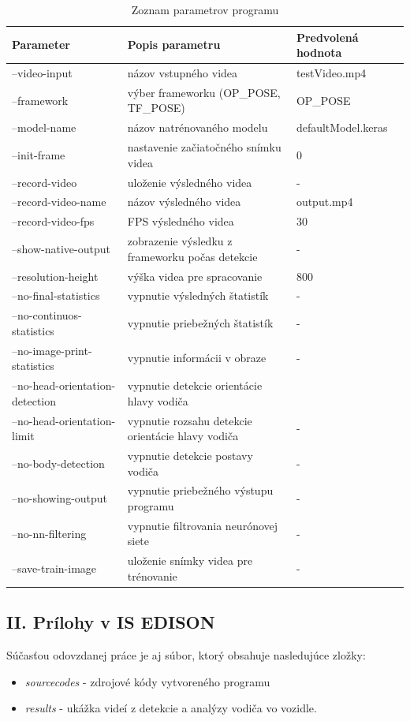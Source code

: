 \documentclass[slovak,master,dept460,male,cpp,cpdeclaration]{diploma}
\begin{document}
\begin{table}[H]
\centering
\begin{tabular}{|l|p{65mm}|p{32mm}|}
\hline
\textbf{Parameter}        & \textbf{Popis parametru}   & \textbf{Predvolená hodnota} \\ \hline
--video-input      &  názov vstupného videa   & testVideo.mp4       \\ \hline
--framework      & výber frameworku (OP\_POSE, TF\_POSE)     & OP\_POSE   \\ \hline
--model-name      & názov natrénovaného modelu     & defaultModel.keras  \\ \hline
--init-frame      & nastavenie začiatočného snímku videa    & 0  \\ \hline
--record-video    & uloženie výsledného videa    & -  \\ \hline
--record-video-name    & názov výsledného videa  & output.mp4  \\ \hline
--record-video-fps    & FPS výsledného videa    & 30  \\ \hline
--show-native-output    & zobrazenie  výsledku z frameworku počas detekcie    & -  \\ \hline
--resolution-height    & výška videa pre spracovanie    & 800  \\ \hline 
--no-final-statistics    & vypnutie výsledných štatistík    & -  \\ \hline
--no-continuos-statistics    & vypnutie priebežných štatistík    & -  \\ \hline
--no-image-print-statistics    & vypnutie informácii v obraze & -  \\ \hline
--no-head-orientation-detection    & vypnutie detekcie orientácie hlavy vodiča    &   \\ \hline
--no-head-orientation-limit    & vypnutie  rozsahu detekcie orientácie hlavy vodiča    & -  \\ \hline
--no-body-detection    & vypnutie detekcie postavy vodiča   & -  \\ \hline
--no-showing-output    & vypnutie priebežného  výstupu programu    & -  \\ \hline
--no-nn-filtering    & vypnutie filtrovania neurónovej siete    & -  \\ \hline
--save-train-image    & uloženie snímky videa  pre trénovanie   & -  \\ \hline
\end{tabular}

	\caption{Zoznam parametrov programu}
	\label{tab:params}
\end{table}

\subsection*{II. Prílohy v IS EDISON}
Súčasťou odovzdanej práce je aj súbor, ktorý obsahuje nasledujúce zložky:
\begin{itemize}
  \item \textit{sourcecodes} - zdrojové kódy vytvoreného programu
  \item \textit{results} - ukážka videí z detekcie a analýzy vodiča vo vozidle.
\end{itemize}
\end{document}
